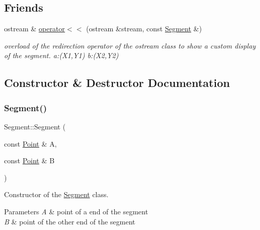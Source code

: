 \subsection*{Friends}
\begin{DoxyCompactItemize}
\item 
ostream \& \hyperlink{class_segment_a494b19a0304a0778bcfb0303f33aec02}{operator$<$$<$} (ostream \&stream, const \hyperlink{class_segment}{Segment} \&)
\begin{DoxyCompactList}\small\item\em overload of the redirection operator of the ostream class to show a custom display of the segment. a\+:(\+X1,\+Y1) b\+:(\+X2,\+Y2) \end{DoxyCompactList}\end{DoxyCompactItemize}


\subsection{Constructor \& Destructor Documentation}
\hypertarget{class_segment_a9ef80a38420c7f5cd5b9e38a5b3b9aa8}{}\label{class_segment_a9ef80a38420c7f5cd5b9e38a5b3b9aa8} 
\subsubsection{\texorpdfstring{Segment()}{Segment()}\hspace{0.1cm}{\footnotesize\ttfamily [1/2]}}
{\footnotesize\ttfamily Segment\+::\+Segment (\begin{DoxyParamCaption}\item[{const \hyperlink{class_point}{Point} \&}]{A,  }\item[{const \hyperlink{class_point}{Point} \&}]{B }\end{DoxyParamCaption})}



Constructor of the \hyperlink{class_segment}{Segment} class. 


\begin{DoxyParams}{Parameters}
{\em A} & point of a end of the segment \\
\hline
{\em B} & point of the other end of the segment \\
\hline
\end{DoxyParams}
\hypertarget{class_segment_a8b4be8979301698353b32b0fcddf12b2}{}\label{class_segment_a8b4be8979301698353b32b0fcddf12b2} 
